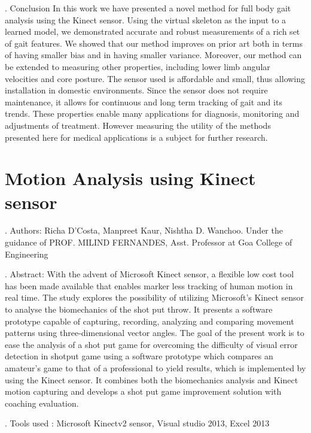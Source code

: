 . Conclusion
\noindent In this work we have presented a novel method for full body gait analysis using the Kinect sensor. Using the virtual skeleton as the input to a learned model, we demonstrated accurate and robust measurements of a rich set of gait features. We showed that our method improves on prior art both in terms of having smaller bias and in having smaller variance. Moreover, our method can be extended to measuring other properties, including lower limb angular velocities and core posture. The sensor used is affordable and small, thus allowing installation in domestic environments. Since the sensor does not require maintenance, it allows for continuous and long term tracking of gait and its trends. These properties enable many applications for diagnosis, monitoring and adjustments of treatment. However measuring the utility of the methods presented here for medical applications is a subject for further research.
\newpage

\section{Motion Analysis using Kinect sensor} \label{Motion Analysis using Kinect sensor}

. Authors:
\noindent Richa D’Costa, Manpreet Kaur, Nishtha D. Wanchoo. Under the guidance of PROF. MILIND FERNANDES, Asst. Professor at Goa College of Engineering

. Abstract:
\noindent With the advent of Microsoft Kinect sensor, a flexible low cost tool has been made available that enables marker less tracking of human motion in real time. The study explores the possibility of utilizing Microsoft’s Kinect sensor to analyse the biomechanics of the shot put throw. It presents a software prototype capable of capturing, recording, analyzing and comparing movement patterns using three-dimensional vector angles. The goal of the present work is to ease the analysis of a shot put game for overcoming the difficulty of visual error detection in shotput game using a software prototype which compares an amateur’s game to that of a professional to yield results, which is implemented by using the Kinect sensor. It combines both the biomechanics analysis and Kinect motion capturing and develops a shot put game improvement solution with coaching evaluation.

. Tools used :
\noindent Microsoft Kinectv2 sensor, Visual studio 2013, Excel 2013

